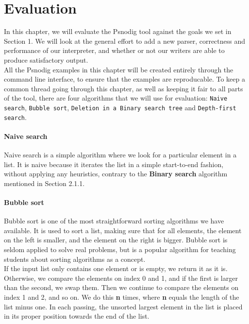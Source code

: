 \chapter{Evaluation}

In this chapter, we will evaluate the Psnodig tool against the goals we set in Section 1. We will look at the general effort to add a new parser, correctness and performance of our interpreter, and whether or not our writers are able to produce satisfactory output. \\

All the Psnodig examples in this chapter will be created entirely through the command line interface, to ensure that the examples are reproducable. To keep a common thread going through this chapter, as well as keeping it fair to all parts of the tool, there are four algorithms that we will use for evaluation: \texttt{Naive search}, \texttt{Bubble sort}, \texttt{Deletion in a Binary search tree} and \texttt{Depth-first search}.

\subsubsection{Naive search}

Naive search is a simple algorithm where we look for a particular element in a list. It is naive because it iterates the list in a simple start-to-end fashion, without applying any heuristics, contrary to the \textbf{Binary search} algorithm mentioned in Section 2.1.1.

\subsubsection{Bubble sort}

Bubble sort is one of the most straightforward sorting algorithms we have available. It is used to sort a list, making sure that for all elements, the element on the left is smaller, and the element on the right is bigger. Bubble sort is seldom applied to solve real problems, but is a popular algorithm for teaching students about sorting algorithms as a concept. \\

If the input list only contains one element or is empty, we return it as it is. Otherwise, we compare the elements on index 0 and 1, and if the first is larger than the second, we swap them. Then we continue to compare the elements on index 1 and 2, and so on. We do this \textbf{n} times, where \textbf{n} equals the length of the list minus one. In each passing, the unsorted largest element in the list is placed in its proper position towards the end of the list.

